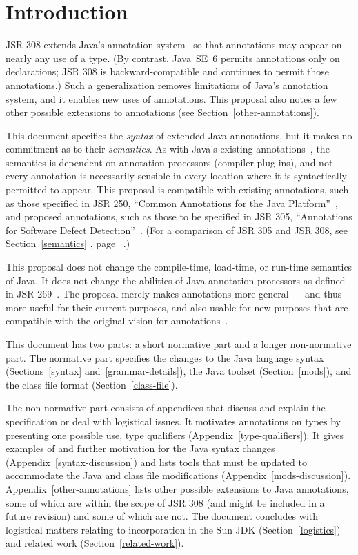 \documentclass[10pt]{article}
\begin{document}
\tableofcontents

\section{Introduction\label{intro}}

JSR 308 extends Java's annotation system~\cite{JSR175} so that
annotations may appear on nearly any use of a type.
(By contrast, Java~SE~6 permits annotations only on
declarations; JSR 308 is
backward-compatible and continues to permit those annotations.)
Such a generalization removes
limitations of Java's annotation
system, and it enables new uses of annotations.
This proposal also notes a few other possible extensions to annotations (see Section~\ref{other-annotations}).

This document specifies the \emph{syntax} of extended Java annotations, but
it makes no commitment as to their \emph{semantics}.  As with Java's
existing annotations~\cite{JSR175}, the semantics is dependent on annotation processors
(compiler plug-ins), and not every annotation is necessarily sensible in
every location where it is syntactically permitted to appear.
This proposal is compatible with existing annotations,
such as those specified in JSR 250, ``Common Annotations for the Java
Platform''~\cite{JSR250}, and proposed annotations, such as those to be
specified in JSR 305, ``Annotations for Software Defect
Detection''~\cite{JSR305}.  (For a comparison of JSR 305 and JSR 308, see Section~\ref{semantics}%
, page~\pageref{semantics}%
.)

This proposal does not change the compile-time, load-time, or run-time
semantics of Java.  It does not change the abilities of Java annotation
processors as defined in JSR 269~\cite{JSR269}.
The proposal merely makes annotations more general --- and thus more useful
for their current purposes, and also usable for new purposes that are
compatible with the original vision for annotations~\cite{JSR175}.

This document has two parts:  a short normative part and a longer
non-normative part.
The normative part specifies the changes to
the Java language syntax (Sections~\ref{syntax} and~\ref{grammar-details}),
the Java toolset (Section~\ref{mods}), and
the class file format (Section~\ref{class-file}).

The non-normative part
consists of appendices that
discuss and explain the specification or deal with logistical issues.
It motivates annotations on types by presenting one
possible use, type qualifiers
(Appendix~\ref{type-qualifiers}).
It gives examples of and further motivation for the Java
syntax changes (Appendix~\ref{syntax-discussion}) and lists tools that
must be updated to accommodate the Java and class file
modifications (Appendix~\ref{mods-discussion}).
Appendix~\ref{other-annotations} lists other possible extensions to
Java annotations, some of which are within the scope of JSR 308 (and might
be included in a future revision) and some of which are not.
The document concludes with
logistical matters relating to
incorporation in the Sun JDK (Section~\ref{logistics})
and
related work (Section~\ref{related-work}).
\end{document}
